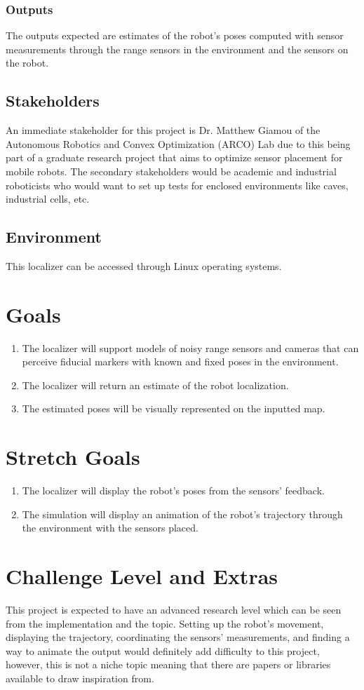 \documentclass{article}
\begin{document}
\subsubsection{Outputs}
The outputs expected are estimates of the robot's poses computed with sensor measurements through the range sensors in the environment and the sensors on the robot.

\subsection{Stakeholders}
An immediate stakeholder for this project is Dr. Matthew Giamou of the Autonomous Robotics and Convex Optimization (ARCO) Lab due to this being part of a graduate research project that aims to optimize sensor placement for mobile robots. The secondary stakeholders would be academic and industrial roboticists who would want to set up tests for enclosed environments like caves, industrial cells, etc.

\subsection{Environment}
This localizer can be accessed through Linux operating systems.

\section{Goals}
\begin{enumerate}
    \item The localizer will support models of noisy range sensors and cameras that can perceive fiducial markers with known and fixed poses in the environment.
    \item The localizer will return an estimate of the robot localization.
    \item The estimated poses will be visually represented on the inputted map.
\end{enumerate} 

\section{Stretch Goals}
\begin{enumerate}           
    \item The localizer will display the robot's poses from the sensors' feedback.
    \item The simulation will display an animation of the robot's trajectory through the environment with the sensors placed.
\end{enumerate}

\section{Challenge Level and Extras}
This project is expected to have an advanced research level which can be seen from the implementation and the topic. Setting up the robot's movement, displaying the trajectory, coordinating the sensors' measurements, and finding a way to animate the output would definitely add difficulty to this project, however, this is not a niche topic meaning that there are papers or libraries available to draw inspiration from.

\newpage{}
\end{document}
